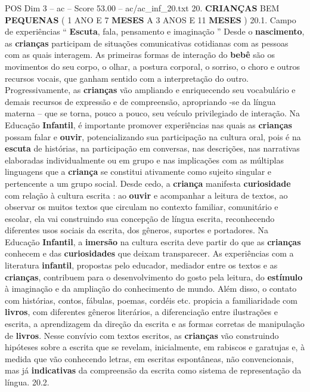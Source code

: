 \begin{textsample}{POS Dim 3 – ac – Score 53.00 – ac/ac\_inf\_20.txt}  \label{ex:f3_pos_023}
20. \textbf{CRIANÇAS} BEM \textbf{PEQUENAS} ( 1 ANO E 7 \textbf{MESES} A 3 ANOS E 11 \textbf{MESES} ) 20.1.
Campo de experiências “ \textbf{Escuta}, fala, pensamento e imaginação ” Desde o \textbf{nascimento}, as \textbf{crianças} participam de situações comunicativas cotidianas com as pessoas com as quais interagem.
As primeiras formas de interação do \textbf{bebê} são os movimentos do seu corpo, o olhar, a postura corporal, o sorriso, o choro e outros recursos vocais, que ganham sentido com a interpretação do outro.
Progressivamente, as \textbf{crianças} vão ampliando e enriquecendo seu vocabulário e demais recursos de expressão e de compreensão, apropriando -se da língua materna – que se torna, pouco a pouco, seu veículo privilegiado de interação.
Na Educação \textbf{Infantil}, é importante promover experiências nas quais as \textbf{crianças} possam falar e \textbf{ouvir}, potencializando sua participação na cultura oral, pois é na \textbf{escuta} de histórias, na participação em conversas, nas descrições, nas narrativas elaboradas individualmente ou em grupo e nas implicações com as múltiplas linguagens que a \textbf{criança} se constitui ativamente como sujeito singular e pertencente a um grupo social.
Desde cedo, a \textbf{criança} manifesta \textbf{curiosidade} com relação à cultura escrita : ao \textbf{ouvir} e acompanhar a leitura de textos, ao observar os muitos textos que circulam no contexto familiar, comunitário e escolar, ela vai construindo sua concepção de língua escrita, reconhecendo diferentes usos sociais da escrita, dos gêneros, suportes e portadores.
Na Educação \textbf{Infantil}, a \textbf{imersão} na cultura escrita deve partir do que as \textbf{crianças} conhecem e das \textbf{curiosidades} que deixam transparecer.
As experiências com a literatura \textbf{infantil}, propostas pelo educador, mediador entre os textos e as \textbf{crianças}, contribuem para o desenvolvimento do gosto pela leitura, do \textbf{estímulo} à imaginação e da ampliação do conhecimento de mundo.
Além disso, o contato com histórias, contos, fábulas, poemas, cordéis etc. propicia a familiaridade com \textbf{livros}, com diferentes gêneros literários, a diferenciação entre ilustrações e escrita, a aprendizagem da direção da escrita e as formas corretas de manipulação de \textbf{livros}.
Nesse convívio com textos escritos, as \textbf{crianças} vão construindo hipóteses sobre a escrita que se revelam, inicialmente, em rabiscos e garatujas e, à medida que vão conhecendo letras, em escritas espontâneas, não convencionais, mas já \textbf{indicativas} da compreensão da escrita como sistema de representação da língua. 20.2.

\end{textsample}
